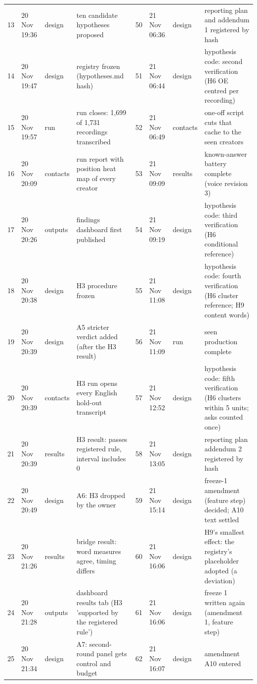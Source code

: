 {\begin{tabular}{@{}rllp{}rllp{}@{}}
13 & 20 Nov 19:36 & design & ten candidate hypotheses proposed & 50 & 21 Nov 06:36 & design & reporting plan and addendum 1 registered by hash \\
14 & 20 Nov 19:47 & design & registry frozen (hypotheses.md hash) & 51 & 21 Nov 06:44 & design & hypothesis code: second verification (H6 OE centred per recording) \\
15 & 20 Nov 19:57 & run & run closes: 1,699 of 1,731 recordings transcribed & 52 & 21 Nov 06:49 & contacts & one-off script cuts that cache to the seen creators \\
16 & 20 Nov 20:09 & contacts & run report with position heat map of every creator & 53 & 21 Nov 09:09 & results & known-answer battery complete (voice revision 3) \\
17 & 20 Nov 20:26 & outputs & findings dashboard first published & 54 & 21 Nov 09:19 & design & hypothesis code: third verification (H6 conditional reference) \\
18 & 20 Nov 20:38 & design & H3 procedure frozen & 55 & 21 Nov 11:08 & design & hypothesis code: fourth verification (H6 cluster reference; H9 content words) \\
19 & 20 Nov 20:39 & design & A5 stricter verdict added (after the H3 result) & 56 & 21 Nov 11:09 & run & seen production complete \\
20 & 20 Nov 20:39 & contacts & H3 run opens every English hold-out transcript & 57 & 21 Nov 12:52 & design & hypothesis code: fifth verification (H6 clusters within 5 units; asks counted once) \\
21 & 20 Nov 20:39 & results & H3 result: passes registered rule, interval includes 0 & 58 & 21 Nov 13:05 & design & reporting plan addendum 2 registered by hash \\
22 & 20 Nov 20:49 & design & A6: H3 dropped by the owner & 59 & 21 Nov 15:14 & design & freeze-1 amendment (feature step) decided; A10 text settled \\
23 & 20 Nov 21:26 & results & bridge result: word measures agree, timing differs & 60 & 21 Nov 16:06 & design & H9's smallest effect: the registry's placeholder adopted (a deviation) \\
24 & 20 Nov 21:28 & outputs & dashboard results tab (H3 'supported by the registered rule') & 61 & 21 Nov 16:06 & design & freeze 1 written again (amendment 1, feature step) \\
25 & 20 Nov 21:34 & design & A7: second-round panel gets control and budget & 62 & 21 Nov 16:07 & design & amendment A10 entered \\

\end{tabular}}
